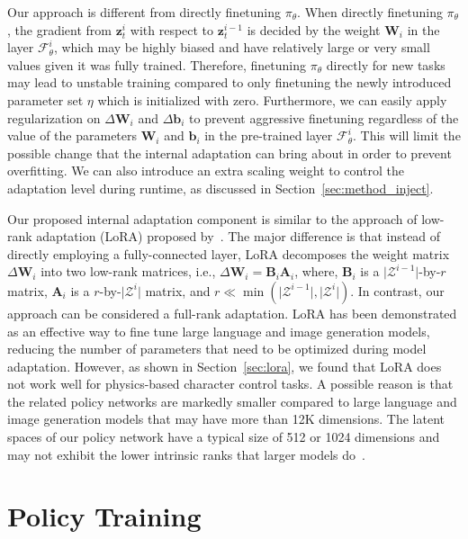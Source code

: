 Our approach is different from directly finetuning $\pi_\theta$.
When directly finetuning $\pi_\theta$,
the gradient from $\mathbf{z}_t^i$ with respect to $\mathbf{z}_t^{i-1}$ is decided by the weight $\mathbf{W}_i$ in the layer $\mathcal{F}_\theta^i$, which may be highly biased and have relatively large or very small values given it was fully trained.
Therefore, finetuning $\pi_\theta$ directly for new tasks may lead to unstable training compared to only finetuning the newly introduced parameter set $\eta$ which is initialized with zero. %
Furthermore, we can easily apply regularization on $\Delta\mathbf{W}_i$ and $\Delta\mathbf{b}_i$ to prevent aggressive finetuning regardless of the value of the parameters $\mathbf{W}_i$ and $\mathbf{b}_i$ in the pre-trained layer $\mathcal{F}_\theta^i$.
This will limit the possible change that the internal adaptation can bring about
in order to prevent overfitting.
We can also introduce an extra scaling weight to control the adaptation level during runtime, as discussed in Section~\ref{sec:method_inject}.

Our proposed internal adaptation component is similar to the approach of low-rank adaptation (LoRA) proposed by~\citet{hu2021lora}.
The major difference %
is that instead of directly employing a fully-connected layer,
LoRA decomposes the weight matrix $\Delta \mathbf{W}_i$ into two low-rank matrices, i.e.,
    $\Delta \mathbf{W}_i = \mathbf{B}_i \mathbf{A}_i$, 
where, %
$\mathbf{B}_i$ is a $\vert \mathcal{Z}^{i-1} \vert$-by-$r$ matrix, 
$\mathbf{A}_i$ is a $r$-by-$\vert \mathcal{Z}^i \vert$ matrix,
and $r \ll \min(\vert \mathcal{Z}^{i-1} \vert, \vert \mathcal{Z}^i \vert)$. 
In contrast, our approach can be considered a full-rank adaptation. 
LoRA has been demonstrated as an effective way to fine tune large language and image generation models, reducing the number of parameters that need to be optimized during model adaptation.
However, as shown in Section~\ref{sec:lora},
we found that %
LoRA does not work well for physics-based character control tasks.
A possible reason is that the related policy networks are markedly
smaller compared to large language and image generation models that may have more than 12K dimensions. 
The latent spaces of our policy network have a typical size of 512 or 1024 dimensions and may 
not exhibit the
lower intrinsic ranks that %
larger models do~\cite{aghajanyan2020intrinsic,pope2021the,li2018measuring}.

\section{Policy Training}\label{sec:method_training}


